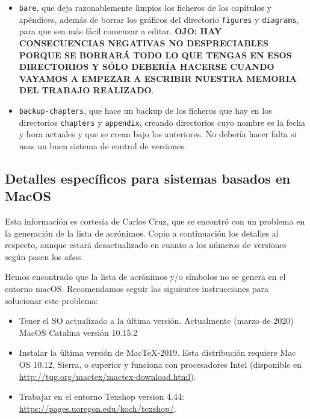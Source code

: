 \documentclass[spanish,openright]{book}
\begin{document}
\begin{itemize}
\begin{itemize}
\item \texttt{bare}, que deja razonablemente limpios los ficheros de
los capítulos y apéndices, además de borrar los gráficos del
directorio \texttt{figures} y \texttt{diagrams}, para que sea más
fácil comenzar a editar. \textbf{OJO: HAY CONSECUENCIAS NEGATIVAS NO
DESPRECIABLES PORQUE SE BORRARÁ TODO LO QUE TENGAS EN ESOS
DIRECTORIOS Y SÓLO DEBERÍA HACERSE CUANDO VAYAMOS A EMPEZAR A
ESCRIBIR NUESTRA MEMORIA DEL TRABAJO REALIZADO}.

\item \texttt{backup-chapters}, que hace un backup de los ficheros que
hay en los directorios \texttt{chapters} y \texttt{appendix},
creando directorios cuyo nombre es la fecha y hora actuales y que se
crean bajo los anteriores. No debería hacer falta si usas un buen
sistema de control de versiones.
\end{itemize}

\end{itemize}


\subsection{Detalles específicos para sistemas basados en MacOS}
\label{sec:detall-espec-para}

Esta información es cortesía de Carlos Cruz, que se encontró con un problema en
la generación de la lista de acrónimos. Copio a continuación los detalles al
respecto, aunque estará desactualizado en cuanto a los números de versiones
según pasen los años.

Hemos encontrado que la lista de acrónimos y/o símbolos no se genera en
el entorno macOS. Recomendamos seguir las siguientes instrucciones para
solucionar este problema:

\begin{itemize}
\item Tener el SO actualizado a la última versión. Actualmente (marzo de
2020) MacOS Catalina versión 10.15.2
\item Instalar la última versión de MacTeX-2019. Esta distribución
requiere Mac OS 10.12, Sierra, o superior y funciona con procesadores
Intel (disponible en
\href{http://tug.org/mactex/mactex-download.html}{http://tug.org/mactex/mactex-download.html}).
\item Trabajar en el entorno Texshop version 4.44:
\href{https://pages.uoregon.edu/koch/texshop/}{https://pages.uoregon.edu/koch/texshop/}.
\end{itemize}
\end{document}
